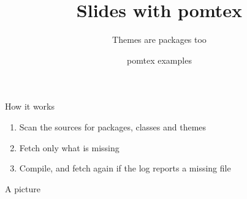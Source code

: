 \documentclass{beamer}
\title{Slides with pomtex}
\subtitle{Themes are packages too}
\author{pomtex examples}
\date{}
\begin{document}
\frame{\titlepage}

\begin{frame}{How it works}
  \begin{enumerate}
    \item Scan the sources for packages, classes and themes
    \item Fetch only what is missing
    \item Compile, and fetch again if the log reports a missing file
  \end{enumerate}
\end{frame}

\begin{frame}{A picture}
  \centering
\end{frame}
\end{document}
